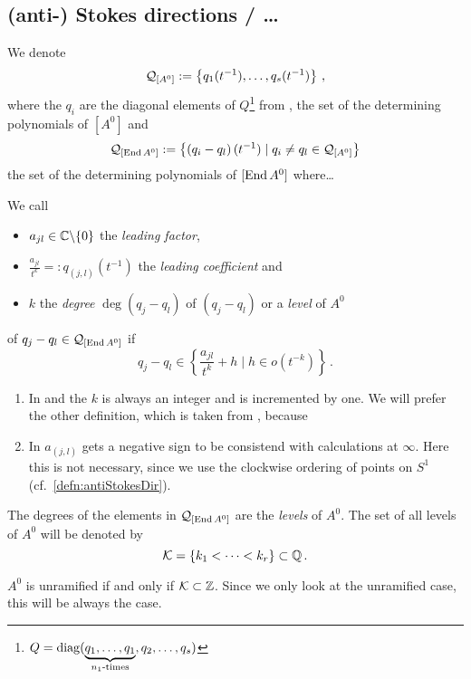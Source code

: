 \subsection{(anti-) Stokes directions / \dots}
\begin{comment}
  \cite[I.4]{Loday1994}
\end{comment}
We denote
\[
  \mathcal{Q}_{[A^0]}
  :=
  \left\{q_1(t^{-1}),\dots,q_s(t^{-1})\right\}
  \,,
\]
where the $q_i$ are the diagonal elements of $Q$\footnote{$Q=\operatorname{diag}(
\underset{n_1\text{-times}}{\underbrace{q_1,\dots,q_1}},q_2,\dots ,q_s)$}
from \TODO{},
the set of the determining polynomials of $[A^0]$ and
\[
  \mathcal{Q}_{[\operatorname{End} A^0]}:=\left\{\left(q_i-q_l\right)(t^{-1})
    \mid q_i \neq q_l \in\mathcal{Q}_{[A^0]}
  \right\}
\]
the set of the determining polynomials of $[\operatorname{End} A^0]$ where\dots
\begin{defn}
  We call
  \begin{itemize}
    \item $a_{jl}\in\mathbb{C}\backslash\{0\}$ the \emph{leading factor},
    \item $\frac{a_{jl}}{t^k}=:q_{(j,l)}(t^{-1})$ the \emph{leading
      coefficient} and
    \item $k$ the \emph{degree} $\deg(q_j-q_l)$ of $(q_j-q_l)$ or a
      \emph{level} of $A^0$
  \end{itemize}
  of $q_j-q_l\in\mathcal{Q}_{[\operatorname{End} A^0]}$ if
  \[
    q_j-q_l\in\left\{ \frac{a_{jl}}{t^k}+h \mid h \in o(t^{-k})\right\} \,.
  \]
  \begin{s-rem}
    \begin{enumerate}
      \item In \cite{boalch} and \cite{thboalch} the $k$ is always an integer
        and is incremented by one. We will prefer the other definition, which
        is taken from \cite{Loday1994}, because \TODO
      \item In \cite[Def.4.3.6]{Loday2014} $a_{(j,l)}$ gets a negative sign to
        be consistend with calculations at $\infty$. Here this is not
        necessary, since we use the clockwise ordering of points on $S^1$
        (cf.~\ref{defn:antiStokesDir}).
        \begin{comment}
          Does that mean, that, to be consistend with \cite{boalch}, one has to
          invert the permutation matrix?
        \end{comment}
    \end{enumerate}
  \end{s-rem}
  The degrees of the elements in $\mathcal{Q}_{[\operatorname{End} A^0]}$ are the
  \emph{levels} of $A^0$.
  The set of all levels of $A^0$ will be denoted by
  \[
    \mathcal{K}=\{k_1<\dots<k_r\} \subset \mathbb{Q} \,.
  \]
  \begin{s-rem}
    $A^0$ is unramified if and only if $\mathcal{K}\subset\mathbb{Z}$. Since we only look at
    the unramified case, this will be always the case.
  \end{s-rem}
\end{defn}

